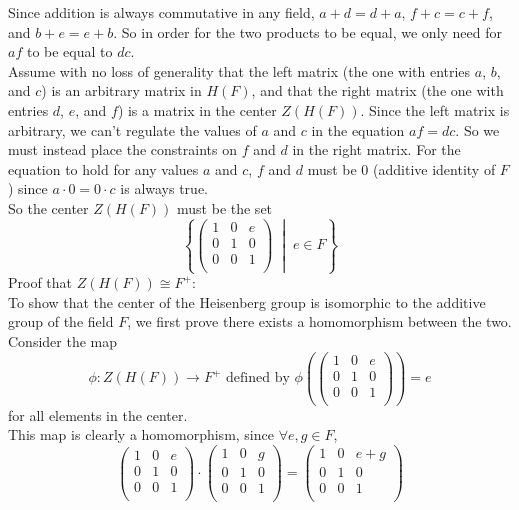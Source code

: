 \documentclass{article}
\begin{document}
    Since addition is always commutative in any field,
    $a + d = d + a$, $f + c = c + f$, and $b + e = e + b$.
    So in order for the two products to be equal,
    we only need for $af$ to be equal to $dc$. \\
    Assume with no loss of generality that the left matrix
    (the one with entries $a$, $b$, and $c$)
    is an arbitrary matrix in $H(F)$,
    and that the right matrix 
    (the one with entries $d$, $e$, and $f$)
    is a matrix in the center $Z(H(F))$.
    Since the left matrix is arbitrary, we can't regulate the values
    of $a$ and $c$ in the equation $af = dc$.
    So we must instead place the constraints on $f$ and $d$ in
    the right matrix.
    For the equation to hold for any values $a$ and $c$,
    $f$ and $d$ must be 0 (additive identity of $F$)
    since $a \cdot 0 = 0 \cdot c$ is always true. \\
    So the center $Z(H(F))$ must be the set
    \[ \left\{ \begin{pmatrix}
        1 & 0 & e \\        
        0 & 1 & 0 \\
        0 & 0 & 1 \\
    \end{pmatrix} \; \middle\vert \; e \in F \right\} \]
    Proof that $Z(H(F)) \cong F^+$: \\
    To show that the center of the Heisenberg group is isomorphic
    to the additive group of the field $F$,
    we first prove there exists a homomorphism between the two.
    Consider the map
    \[\phi: Z(H(F)) \to F^+
    \text{ defined by } \phi\left( \begin{pmatrix}
        1 & 0 & e \\        
        0 & 1 & 0 \\
        0 & 0 & 1 \\
    \end{pmatrix} \right) = e \]
    for all elements in the center. \\
    This map is clearly a homomorphism, since $\forall e, g \in F$,
    \[\begin{pmatrix}
        1 & 0 & e \\        
        0 & 1 & 0 \\
        0 & 0 & 1 \\
    \end{pmatrix} \cdot \begin{pmatrix}
        1 & 0 & g \\        
        0 & 1 & 0 \\
        0 & 0 & 1 \\
    \end{pmatrix}
    = \begin{pmatrix}
        1 & 0 & e + g \\        
        0 & 1 & 0 \\
        0 & 0 & 1 \\
    \end{pmatrix}
    \]
\end{document}

